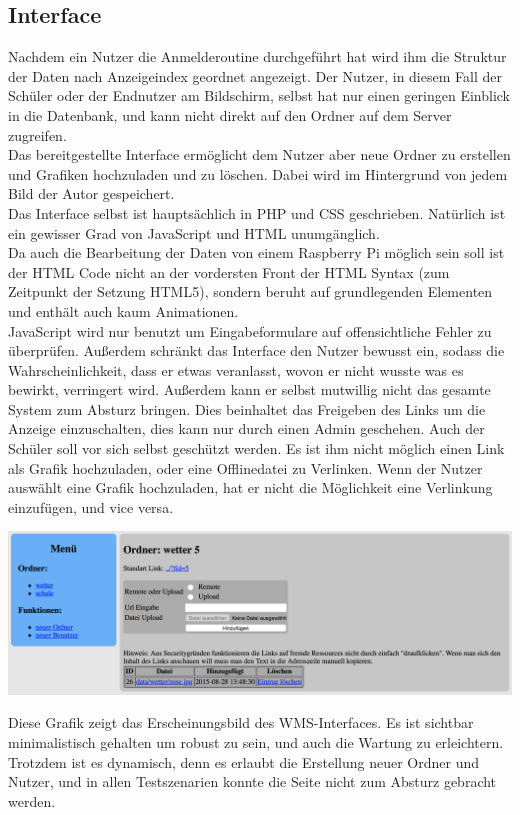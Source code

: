 \subsection{Interface} %
Nachdem ein Nutzer die Anmelderoutine durchgeführt hat wird ihm die Struktur der Daten nach Anzeigeindex geordnet angezeigt.
Der Nutzer, in diesem Fall der Schüler oder der Endnutzer am Bildschirm,
selbst hat nur einen geringen Einblick in die Datenbank, und kann nicht direkt auf den Ordner auf dem Server zugreifen.\\
Das bereitgestellte Interface ermöglicht dem Nutzer aber neue Ordner
zu erstellen und Grafiken hochzuladen und zu löschen.
Dabei wird im Hintergrund von jedem Bild der Autor gespeichert. \\
Das Interface selbst ist hauptsächlich in PHP und CSS geschrieben.
Natürlich ist ein gewisser Grad von JavaScript und HTML unumgänglich. \\
Da auch die Bearbeitung der Daten von einem Raspberry Pi möglich sein soll ist der HTML Code nicht an der vordersten Front der HTML Syntax (zum Zeitpunkt der Setzung HTML5),
sondern beruht auf grundlegenden Elementen und enthält auch kaum Animationen. \\
JavaScript wird nur benutzt um Eingabeformulare auf offensichtliche Fehler zu überprüfen.
Außerdem schränkt das Interface den Nutzer bewusst ein,
sodass die Wahrscheinlichkeit,
dass er etwas veranlasst, wovon er nicht wusste was es bewirkt, verringert wird.
Außerdem kann er selbst mutwillig nicht das gesamte System zum Absturz bringen.
Dies beinhaltet das Freigeben des Links um die Anzeige einzuschalten,
dies kann nur durch einen Admin geschehen.
Auch der Schüler soll vor sich selbst geschützt werden.
Es ist ihm nicht möglich einen Link als Grafik hochzuladen,
oder eine Offlinedatei zu Verlinken.
Wenn der Nutzer auswählt eine Grafik hochzuladen,
hat er nicht die Möglichkeit eine Verlinkung einzufügen, und vice versa.
\begin{center}
    \includegraphics[width=\linewidth]{imgs/wms/wms_interface.png}
\end{center}
Diese Grafik zeigt das Erscheinungsbild des WMS-Interfaces. Es ist sichtbar
minimalistisch gehalten um robust zu sein, und auch die Wartung zu erleichtern.
Trotzdem ist es dynamisch, denn es erlaubt die Erstellung neuer Ordner und Nutzer,
und in allen Testszenarien konnte die Seite nicht zum Absturz gebracht werden.

